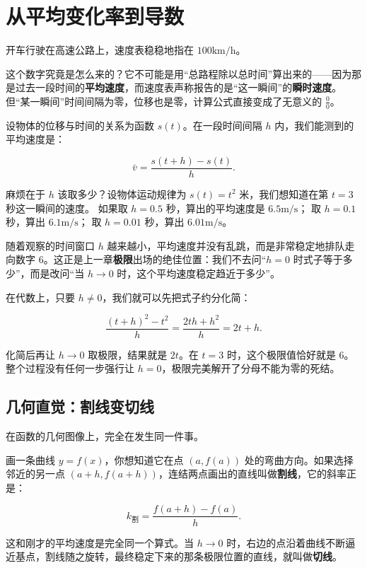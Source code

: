 \section{从平均变化率到导数}
\label{sec:02-Calculus/03-Differentiation/01}

开车行驶在高速公路上，速度表稳稳地指在 \(100\text{km/h}\)。

这个数字究竟是怎么来的？它不可能是用``总路程除以总时间''算出来的——因为那是过去一段时间的\textbf{平均速度}，而速度表声称报告的是``这一瞬间''的\textbf{瞬时速度}。但``某一瞬间''时间间隔为零，位移也是零，计算公式直接变成了无意义的 \(\frac{0}{0}\)。

设物体的位移与时间的关系为函数 \(s(t)\)。在一段时间间隔 \(h\) 内，我们能测到的平均速度是：

\[
\bar v = \frac{s(t+h)-s(t)}{h}.
\]

麻烦在于 \(h\) 该取多少？设物体运动规律为 \(s(t)=t^2\) 米，我们想知道在第 \(t=3\) 秒这一瞬间的速度。
如果取 \(h=0.5\) 秒，算出的平均速度是 \(6.5\text{m/s}\)；
取 \(h=0.1\) 秒，算出 \(6.1\text{m/s}\)；
取 \(h=0.01\) 秒，算出 \(6.01\text{m/s}\)。

随着观察的时间窗口 \(h\) 越来越小，平均速度并没有乱跳，而是非常稳定地排队走向数字 \(6\)。这正是上一章\textbf{极限}出场的绝佳位置：我们不去问``\(h=0\) 时式子等于多少''，而是改问``当 \(h\to0\) 时，这个平均速度稳定趋近于多少''。

在代数上，只要 \(h\neq0\)，我们就可以先把式子约分化简：

\[
\frac{(t+h)^2-t^2}{h}=\frac{2th+h^2}{h}=2t+h.
\]

化简后再让 \(h\to0\) 取极限，结果就是 \(2t\)。在 \(t=3\) 时，这个极限值恰好就是 \(6\)。整个过程没有任何一步强行让 \(h=0\)，极限完美解开了分母不能为零的死结。

\subsection{几何直觉：割线变切线}

在函数的几何图像上，完全在发生同一件事。

画一条曲线 \(y=f(x)\)，你想知道它在点 \((a,f(a))\) 处的弯曲方向。如果选择邻近的另一点 \((a+h,f(a+h))\)，连结两点画出的直线叫做\textbf{割线}，它的斜率正是：

\[
k_{\text{割}} = \frac{f(a+h)-f(a)}{h}.
\]

这和刚才的平均速度是完全同一个算式。当 \(h\to0\) 时，右边的点沿着曲线不断逼近基点，割线随之旋转，最终稳定下来的那条极限位置的直线，就叫做\textbf{切线}。

